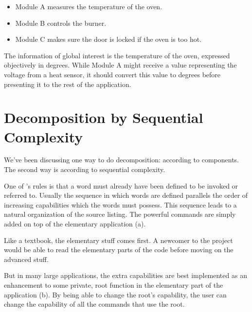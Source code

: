 \begin{itemize}
\item	Module A measures the temperature of the oven.

\item	Module B controls the burner.

\item	Module C makes sure the door is locked if the oven is too hot.
\end{itemize}
The information of global interest is the temperature of the oven,
expressed objectively in degrees. While Module A might receive a value
representing the voltage from a heat sensor, it should convert this
value to degrees before presenting it to the rest of the application.%
%
%
%

\section{Decomposition by Sequential Complexity}%
%
%

We've been discussing one way to do decomposition: according to
components. The second way is according to sequential complexity.

One of \Forth{}'s rules is that a word must already have been defined to
be invoked or referred to. Usually the sequence in which words are
defined parallels the order of increasing capabilities which the words
must possess. This sequence leads to a natural organization of the
source listing. The powerful commands are simply added on top of the
elementary application (a).

Like a textbook, the elementary stuff comes first. A newcomer to
the project would be able to read the elementary parts of the code before
moving on the advanced stuff.


But in many large applications, the extra capabilities are best
implemented as an enhancement to some private, root function in the
elementary part of the application (b). By being able to
change the root's capability, the user can change the capability of all the
commands that use the root.

